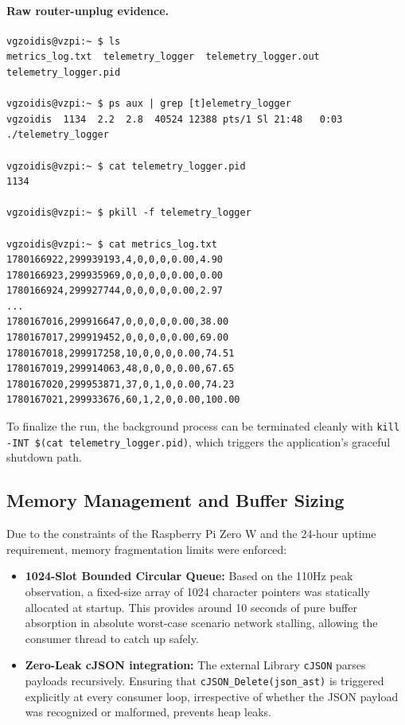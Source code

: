 \documentclass[12pt,a4paper]{article}
\begin{document}
\paragraph{Raw router-unplug evidence.}
\begin{verbatim}
vgzoidis@vzpi:~ $ ls
metrics_log.txt  telemetry_logger  telemetry_logger.out  telemetry_logger.pid

vgzoidis@vzpi:~ $ ps aux | grep [t]elemetry_logger
vgzoidis  1134  2.2  2.8  40524 12388 pts/1 Sl 21:48   0:03 ./telemetry_logger

vgzoidis@vzpi:~ $ cat telemetry_logger.pid
1134

vgzoidis@vzpi:~ $ pkill -f telemetry_logger

vgzoidis@vzpi:~ $ cat metrics_log.txt
1780166922,299939193,4,0,0,0,0.00,4.90
1780166923,299935969,0,0,0,0,0.00,0.00
1780166924,299927744,0,0,0,0,0.00,2.97
...
1780167016,299916647,0,0,0,0,0.00,38.00
1780167017,299919452,0,0,0,0,0.00,69.00
1780167018,299917258,10,0,0,0,0.00,74.51
1780167019,299914063,48,0,0,0,0.00,67.65
1780167020,299953871,37,0,1,0,0.00,74.23
1780167021,299933676,60,1,2,0,0.00,100.00
\end{verbatim}

To finalize the run, the background process can be terminated cleanly with \texttt{kill -INT \$(cat telemetry\_logger.pid)}, which triggers the application's graceful shutdown path.

\subsection{Memory Management and Buffer Sizing}
Due to the constraints of the Raspberry Pi Zero W and the 24-hour uptime requirement, memory fragmentation limits were enforced:
\begin{itemize}
    \item \textbf{1024-Slot Bounded Circular Queue:} Based on the 110Hz peak observation, a fixed-size array of 1024 character pointers was statically allocated at startup. This provides around 10 seconds of pure buffer absorption in absolute worst-case scenario network stalling, allowing the consumer thread to catch up safely.
    \item \textbf{Zero-Leak cJSON integration:} The external Library \texttt{cJSON} parses payloads recursively. Ensuring that \texttt{cJSON\_Delete(json\_ast)} is triggered explicitly at every consumer loop, irrespective of whether the JSON payload was recognized or malformed, prevents heap leaks.
\end{itemize}
\end{document}
